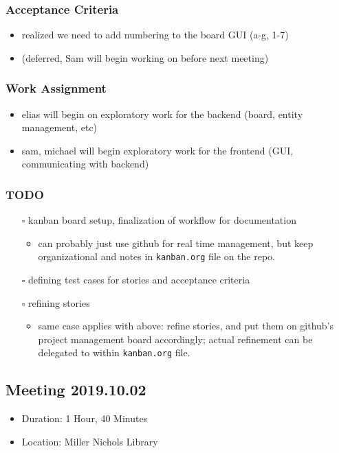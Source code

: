 \documentclass[11pt]{article}
\begin{document}
\subsubsection*{Acceptance Criteria}
\label{sec:org8718685}
\begin{itemize}
\item realized we need to add numbering to the board GUI (a-g, 1-7)
\item (deferred, Sam will begin working on before next meeting)
\end{itemize}
\subsubsection*{Work Assignment}
\label{sec:org47eab8b}
\begin{itemize}
\item elias will begin on exploratory work for the backend (board, entity management, etc)
\item sam, michael will begin exploratory work for the frontend (GUI, communicating with backend)
\end{itemize}
\subsubsection*{{\bfseries\sffamily TODO} }
\label{sec:orgbabf3b8}
\begin{itemize}
\item[{$\square$}] kanban board setup, finalization of workflow for documentation
\begin{itemize}
\item can probably just use github for real time management, but keep organizational and notes in
\texttt{kanban.org} file on the repo.
\end{itemize}
\item[{$\square$}] defining test cases for stories and acceptance criteria
\item[{$\square$}] refining stories
\begin{itemize}
\item same case applies with above: refine stories, and put them on github's project management
board accordingly; actual refinement can be delegated to within \texttt{kanban.org} file.
\end{itemize}
\end{itemize}
\subsection{Meeting 2019.10.02}
\label{sec:orgf9e087e}
\begin{itemize}
\item Duration: 1 Hour, 40 Minutes
\item Location: Miller Nichols Library
\end{itemize}
\end{document}
